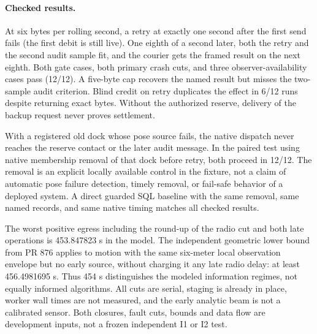 \documentclass{article}
\begin{document}
\paragraph{Checked results.}
At six bytes per rolling second, a retry at exactly one second after the
first send fails (the first debit is still live). One eighth of a second
later, both the retry and the second audit sample fit, and the courier
gets the framed result on the next eighth. Both gate cases, both primary
crash cuts, and three observer-availability cases pass (12/12).
A five-byte cap recovers the named result but misses the two-sample
audit criterion. Blind credit on retry duplicates the effect in 6/12
runs despite returning exact bytes. Without the authorized reserve,
delivery of the backup request never proves settlement.

With a registered old dock whose pose source fails, the native
dispatch never reaches the reserve contact or the later audit
message. In the paired test using native membership removal of that
dock before retry, both proceed in 12/12. The removal is an explicit
locally available control in the fixture, not a claim of automatic pose
failure detection, timely removal, or fail-safe behavior of a deployed
system. A direct guarded SQL baseline with the same removal,
same named records, and same native timing matches all checked results.

The worst positive egress including the round-up of the radio cut and
both late operations is 453.847823 s in the model. The independent
geometric lower bound from PR 876 applies to motion with the same
six-meter local observation envelope but no early source, without charging it
any late radio delay: at least 456.4981695 s. Thus 454 s distinguishes
the modeled information regimes, not equally informed algorithms.
All cuts are serial, staging is already in place, worker wall times are
not measured, and the early analytic beam is not a calibrated sensor.
Both closures, fault cuts, bounds and data flow are development inputs,
not a frozen independent I1 or I2 test.
\end{document}
